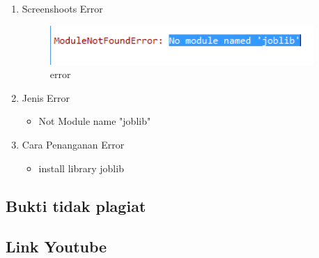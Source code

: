 	\begin{enumerate}
		\item Screenshoots Error
			\begin{figure}[H]
				\begin{center}
				 \includegraphics[width=10cm]{figures/1174076/figures1/error_1.png}
				 \caption{error}	
				\end{center}
			\end{figure}
			
		\item Jenis Error
			\begin{itemize}
				\item Not Module name "joblib"
			\end{itemize}
			
			\item Cara Penanganan Error
			\begin{itemize}
				\item install library joblib
			\end{itemize}
			
	\end{enumerate}
	
\subsection{Bukti tidak plagiat}

\subsection{Link Youtube}

	
